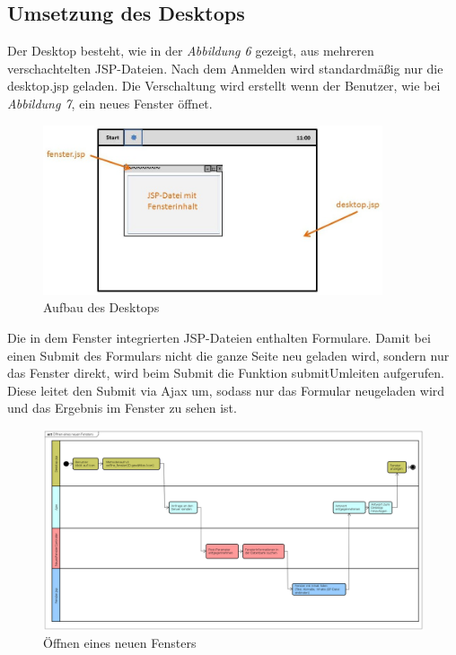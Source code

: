 \documentclass[12pt, a4paper]{article}
\begin{document}
\subsection{Umsetzung des Desktops}
Der Desktop besteht, wie in der \textit{Abbildung 6} gezeigt, aus mehreren verschachtelten JSP-Dateien. Nach dem Anmelden wird standardmäßig nur die \glqq desktop.jsp\grqq{} geladen. Die Verschaltung wird erstellt wenn der Benutzer, wie bei \textit{Abbildung 7}, ein neues Fenster öffnet.

\begin{figure}[H]
	\begin{center}
		\includegraphics[width=100mm]{Bilder/desktop.jpg}
	\end{center}
	\caption{Aufbau des Desktops}
\end{figure}

Die in dem Fenster integrierten JSP-Dateien enthalten Formulare. Damit bei einen Submit des Formulars nicht die ganze Seite neu geladen wird, sondern nur das Fenster direkt, wird beim Submit die Funktion \glqq submitUmleiten\grqq{} aufgerufen. Diese leitet den Submit via Ajax um, sodass nur das Formular neugeladen wird und das Ergebnis im Fenster zu sehen ist.


\begin{figure}[H]
	\begin{center}
		\includegraphics[width=220mm,angle=90]{Bilder/fenster_oeffnen.png}
	\end{center}
	\caption{Öffnen eines neuen Fensters}
\end{figure}
\end{document}
